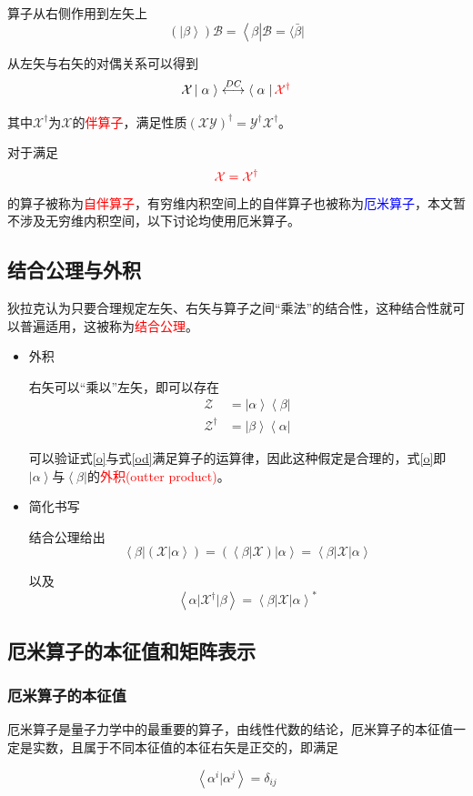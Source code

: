 \documentclass[UTF8,12pt]{article}
\providecommand\Ket[1]{\left|\right. #1 \left.\right\rangle}
\providecommand\Bra[1]{\left\langle\right. #1 \left.\right|}
\providecommand\Bracket[2]{\left\langle #1 \big| #2 \right\rangle}
\providecommand\BraCket[3]{\left\langle #1 \big| #2 \big| #3 \right\rangle}
\providecommand\dual{\stackrel{DC}{\longleftrightarrow}}
\numberwithin{equation}{subsection}
\providecommand{\empB}[1]{\textcolor{blue}{#1}}
\providecommand{\empR}[1]{\textcolor{red}{#1}}
\begin{document}
\begin{itemize}
		算子从右侧作用到左矢上
		$$
			(\Ket{\beta})\mathcal B=\Bra{\beta}\mathcal B=\langle\bar{\beta}|
		$$
		
		从左矢与右矢的对偶关系可以得到$$\mathcal X\Ket{\alpha}\dual\Bra{\alpha}\empR{\mathcal X^\dagger}$$
		
		其中$\mathcal X^\dagger$为$\mathcal X$的\empR{伴算子}，满足性质$(\mathcal{XY})^\dagger=\mathcal Y^\dagger \mathcal X^\dagger$。
		
		对于满足$$\empR{\mathcal X=\mathcal X^\dagger}$$的算子被称为\empR{自伴算子}，有穷维内积空间上的自伴算子也被称为\empB{厄米算子}，本文暂不涉及无穷维内积空间，以下讨论均使用厄米算子。
		
	\end{itemize}
	\subsection{结合公理与外积}
	
	狄拉克认为只要合理规定左矢、右矢与算子之间“乘法”的结合性，这种结合性就可以普遍适用，这被称为\empR{结合公理}。
	
	\begin{itemize}
		\item 外积
		
		右矢可以“乘以”左矢，即可以存在
		\begin{subequations}
			\begin{align}
				\mathcal Z &= \Ket{\alpha}\Bra{\beta}\label{o}\\
				\mathcal Z^\dagger &= \Ket{\beta}\Bra{\alpha}\label{od}
			\end{align}
		\end{subequations}
		
		可以验证式\ref{o}与式\ref{od}满足算子的运算律，因此这种假定是合理的，式\ref{o}即$\Ket{\alpha}$与$\Bra{\beta}$的\empR{外积(outter product)}。
		\item 简化书写
		
		结合公理给出$$\Bra{\beta}(\mathcal X\Ket{\alpha})=(\Bra \beta \mathcal X)\Ket{\alpha}=\BraCket{\beta}{\mathcal X}{\alpha}$$
		
		以及$$\BraCket{\alpha}{\mathcal X^\dagger}{\beta}=\BraCket{\beta}{\mathcal X}{\alpha}^*$$
	\end{itemize}
	\subsection{厄米算子的本征值和矩阵表示}
	\subsubsection{厄米算子的本征值}
	厄米算子是量子力学中的最重要的算子，由线性代数的结论，厄米算子的本征值一定是实数，且属于不同本征值的本征右矢是正交的，即满足
	\begin{snugshade}
		\begin{equation}
			\Bracket{\alpha^i}{\alpha^j}=\delta_{ij}
			\label{orth}
		\end{equation}
	\end{snugshade}
\end{document}
